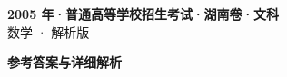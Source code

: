 \documentclass[zihao=-4, a4paper]{ctexart}
\begin{document}
\begin{center}
  {\Large\bfseries 2005 年·普通高等学校招生考试·湖南卷·文科}\\[4pt]
  {\large 数学 · 解析版}
\end{center}
\medskip
{}

\clearpage
{}
\begin{center}{\Large\bfseries 参考答案与详细解析}\end{center}
\medskip

\end{document}
